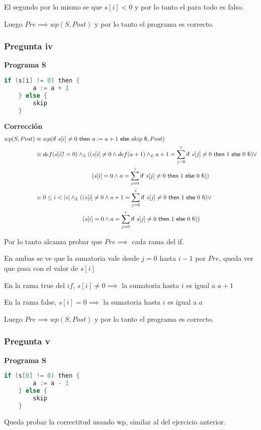 El segundo por lo mismo se que $ s[i] < 0 $ y por lo tanto el para todo es falso.

Luego $ Pre \implies wp(S, Post) $ y por lo tanto el programa es correcto.

\subsubsection{Pregunta iv}

\textbf{Programa S}

\begin{lstlisting}[language = C++]
    if (s[i] != 0) then {
        a := a + 1
    } else {
        skip
    } 
\end{lstlisting}

\textbf{Corrección}
\begin{align*}
    wp(S, Post) &\equiv wp(\mathsf{if}\ s[i] \neq 0\ \mathsf{then}\ a := a + 1\ \mathsf{else}\ skip\ \mathsf{fi}, Post) \\
    &\equiv def(s[i] != 0) \land _L ((s[i] \neq 0 \wedge def(a+1) \land _L a+1 = \sum_{j=0}^{i}\mathsf{if}\ s[j]\neq 0\ \mathsf{then}\ 1\ \mathsf{else}\ 0\ \mathsf{fi} ) \vee \\ 
    &\qquad \qquad \qquad \qquad \quad \; \; (s[i] = 0 \wedge a = \sum_{j=0}^{i}\mathsf{if}\ s[j]\neq 0\ \mathsf{then}\ 1\ \mathsf{else}\ 0\ \mathsf{fi}  )) \\
    &\equiv 0 \leq i < |s| \land _L ((s[i] \neq 0 \wedge a+1 = \sum_{j=0}^{i}\mathsf{if}\ s[j]\neq 0\ \mathsf{then}\ 1\ \mathsf{else}\ 0\ \mathsf{fi} ) \vee \\ 
    &\qquad \qquad \qquad \qquad (s[i] = 0 \wedge a = \sum_{j=0}^{i}\mathsf{if}\ s[j]\neq 0\ \mathsf{then}\ 1\ \mathsf{else}\ 0\ \mathsf{fi}  )) \\
\end{align*}

Por lo tanto alcanza probar que $ Pre \implies $ cada rama del if.

En ambas se ve que la sumatoria vale desde $ j = 0 $ hasta $ i-1 $ por $ Pre $, queda ver que pasa con el valor de $ s[i] $

En la rama true del $if$, $ s[i] \neq 0 \implies $ la sumatoria hasta $i$ es igual a $ a+1 $

En la rama false, $ s[i] = 0 \implies $ la sumatoria hasta $i$ es igual a $a$

Luego $ Pre \implies wp(S, Post) $ y por lo tanto el programa es correcto.

\subsubsection{Pregunta v}

\textbf{Programa S}

\begin{lstlisting}[language = C++]
    if (s[0] != 0) then {
        a := a - 1
    } else {
        skip
    } 
\end{lstlisting}

Queda probar la correctitud usando wp, similar al del ejercicio anterior.
